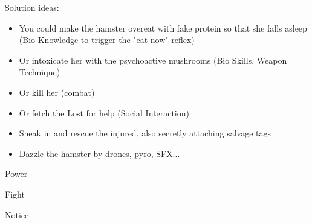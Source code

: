 Solution ideas:
\begin{itemize}
\item You could make the hamster overeat with fake protein so that she falls asleep (Bio
Knowledge to trigger the "eat now" reflex)
\item Or intoxicate her with the psychoactive mushrooms (Bio Skills, Weapon Technique)
\item Or kill her (combat)
\item Or fetch the Lost for help (Social Interaction)
\item Sneak in and rescue the injured, also secretly attaching salvage tags
\item Dazzle the hamster by drones, pyro, SFX...
\end{itemize}


\begin{npcBox}[title=Hamster]

    \begin{aspects}
    \item {}
    \item {}
    \item {}
    \end{aspects}
    
    \begin{skills}
    \item {} Power
    \item {} Fight
    \item {} Notice
    \end{skills}
    
    \begin{stunts}
    \item {}
    \end{stunts}
    
    \begin{stressSection}
    \end{stressSection}
    \begin{tabularx}{\textwidth}{ XX }
    \end{tabularx}
    

\end{npcBox}
